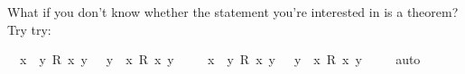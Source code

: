 \begin{isabellebody}
\begin{isamarkuptext}
What if you don't know whether the statement you're interested in is a theorem? Try try:%
\end{isamarkuptext}\isamarkuptrue%
\isamarkupfalse%
\ {\isachardoublequoteopen}{\isacharparenleft}{\isasymforall}\ x{\isachardot}\ {\isasymexists}\ y{\isachardot}\ R\ x\ y{\isacharparenright}\ {\isasymlongrightarrow}\ {\isacharparenleft}{\isasymexists}\ y{\isachardot}\ {\isasymforall}\ x{\isachardot}\ R\ x\ y{\isacharparenright}{\isachardoublequoteclose}\ \isamarkupfalse%
%
\isadelimproof
\ %
\endisadelimproof
%
\isatagproof
{}\isamarkupfalse%
%
\endisatagproof
{\isafoldproof}%
%
\isadelimproof
%
\endisadelimproof
\isanewline
\isanewline
{}\isamarkupfalse%
\ {\isachardoublequoteopen}{\isacharparenleft}{\isasymexists}\ x{\isachardot}\ {\isasymforall}\ y{\isachardot}\ R\ x\ y{\isacharparenright}\ {\isasymlongrightarrow}\ {\isacharparenleft}{\isasymforall}\ y{\isachardot}\ {\isasymexists}\ x{\isachardot}\ R\ x\ y{\isacharparenright}{\isachardoublequoteclose}\ \isamarkupfalse%
\isanewline
%
\isadelimproof
\ \ %
\endisadelimproof
%
\isatagproof
{}\isamarkupfalse%
\ auto\isanewline
%
\endisatagproof
{\isafoldproof}%
%
\isadelimproof
%
\endisadelimproof
%
\isadelimtheory
%
\endisadelimtheory
%
\isatagtheory
%
\endisatagtheory
{\isafoldtheory}%
%
\isadelimtheory
%
\endisadelimtheory
%
\end{isabellebody}%
